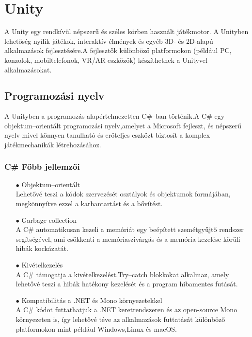 \documentclass[
]{thesis-ekf}
\theoremstyle{definition}
\theoremstyle{remark}
\begin{document}
\section{Unity}
A Unity egy rendkívül népszerű és széles körben használt játékmotor. A Unityben lehetőség nyílik játékok, interaktív élmények és egyéb 3D- és 2D-alapú alkalmazások fejlesztésére.A fejlesztők különböző platformokon (például PC, konzolok, mobiltelefonok, VR/AR eszközök) készíthetnek a Unityvel alkalmazásokat.
\subsection{Programozási nyelv}
A Unityben a programozás alapértelmezetten  C\#--ban történik.A C\# egy objektum--orientált programozási nyelv,amelyet a Microsoft fejleszt, és népszerű nyelv mivel könnyen tanulható és erőteljes eszközt biztosít a komplex játékmechanikák létrehozásához.
\subsubsection{C\# Főbb jellemzői}
\begin{itemize}
	\item[$\bullet$]Objektum--orientált \\Lehetővé teszi a kódok szervezését osztályok és objektumok formájában, megkönnyítve ezzel a karbantartást és a bővítést.
	\item[$\bullet$]Garbage collection\\A C\# automatikusan kezeli a memóriát egy beépített szemétgyűjtő rendszer segítségével, ami csökkenti a memóriaszivárgás és a memória kezelése körüli hibák kockázatát.
	\item[$\bullet$]Kivételkezelés\\A C\# támogatja a kivételkezelést.Try--catch blokkokat alkalmaz, amely lehetővé teszi a hibák hatékony kezelését és a program hibamentes futását.
	\item[$\bullet$]Kompatibilitás a .NET és Mono környezetekkel\\A C\# kódot futtathatjuk a .NET keretrendszeren és az open-source Mono környezeten is, így lehetővé téve az alkalmazások futtatását különböző platformokon mint például Windows,Linux és macOS.
\end{itemize}
\end{document}
